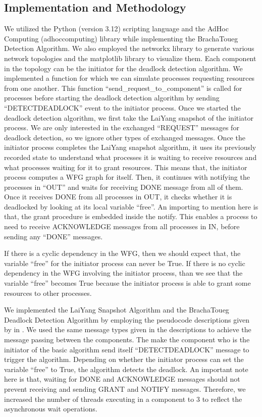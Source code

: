 \documentclass[letterpaper,10pt,english]{sphinxmanual}
\begin{document}
\subsection{Implementation and Methodology}
\label{\detokenize{docs/BrachaToueg/results:implementation-and-methodology}}
\sphinxAtStartPar
We utilized the Python (version 3.12) scripting language and the Ad\sphinxhyphen{}Hoc Computing (adhoccomputing) library while implementing the Bracha\sphinxhyphen{}Toueg Detection Algorithm. We also employed the networkx library to generate various network topologies and the matplotlib library to visualize them. Each component in the topology can be the initiator for the deadlock detection algorithm. We implemented a function for which we can simulate processes requesting resources from one another. This function “send\_request\_to\_component” is called for processes before starting the deadlock detection algorithm by sending “DETECTDEADLOCK” event to the initiator process. Once we started the deadlock detection algorithm, we first take the Lai\sphinxhyphen{}Yang snapshot of the initiator process. We are only interested in the exchanged “REQUEST” messages for deadlock detection, so we ignore other types of exchanged messages. Once the initiator process completes the Lai\sphinxhyphen{}Yang snapshot algorithm, it uses its previously recorded state to understand what processes it is waiting to receive resources and what processes waiting for it to grant resources. This means that, the initiator process computes a WFG graph for itself. Then, it continues with notifying the processes in “OUT” and waits for receiving DONE message from all of them. Once it receives DONE from all processes in OUT, it checks whether it is deadlocked by looking at its local variable “free”. An importing to mention here is that, the grant procedure is embedded inside the notify. This enables a process to need to receive ACKNOWLEDGE messages from all processes in IN, before sending any “DONE” messages.

\sphinxAtStartPar
If there is a cyclic dependency in the WFG, then we should expect that, the variable “free” for the initiator process can never be True. If there is no cyclic dependency in the WFG involving the initiator process, than we see that the variable “free” becomes True because the initiator process is able to grant some resources to other processes.

\sphinxAtStartPar
We implemented the Lai\sphinxhyphen{}Yang Snapshot Algorithm and the Bracha\sphinxhyphen{}Toueg Deadlock Detection Algorithm by employing the pseudocode descriptions given by in . We used the same message types given in the descriptions to achieve the message passing between the components. The make the component who is the initiator of the basic algorithm send itself “DETECTDEADLOCK” message to trigger the algorithm. Depending on whether the initiator process can set the variable “free” to True, the algorithm detects the deadlock. An important note here is that, waiting for DONE and ACKNOWLEDGE messages should not prevent receiving and sending GRANT and NOTIFY messages. Therefore, we increased the number of threads executing in a component to 3 to reflect the asynchronous wait operations.
\end{document}
